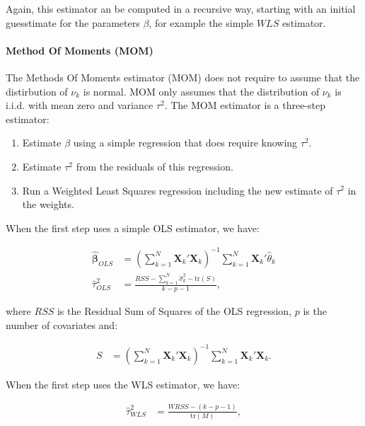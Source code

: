 \documentclass[
]{book}
\providecommand{\tightlist}{%
  \setlength{\itemsep}{0pt}\setlength{\parskip}{0pt}}
\theoremstyle{definition}
\theoremstyle{definition}
\theoremstyle{definition}
\theoremstyle{definition}
\theoremstyle{remark}
\begin{document}
Again, this estimator an be computed in a recursive way, starting with an initial guesstimate for the parameters \(\beta\), for example the simple \(WLS\) estimator.

\hypertarget{method-of-moments-mom}{%
\paragraph{Method Of Moments (MOM)}\label{method-of-moments-mom}}

The Methods Of Moments estimator (MOM) does not require to assume that the distirbution of \(\nu_k\) is normal.
MOM only assumes that the distribution of \(\nu_k\) is i.i.d. with mean zero and variance \(\tau^2\).
The MOM estimator is a three-step estimator:

\begin{enumerate}
\def\labelenumi{\arabic{enumi}.}
\tightlist
\item
  Estimate \(\beta\) using a simple regression that does require knowing \(\tau^2\).
\item
  Estimate \(\tau^2\) from the residuals of this regression.
\item
  Run a Weighted Least Squares regression including the new estimate of \(\tau^2\) in the weights.
\end{enumerate}

When the first step uses a simple OLS estimator, we have:

\begin{align*}
  \mathbf{\hat{\beta}}_{OLS} & = \left(\sum_{k=1}^N\mathbf{X}_k'\mathbf{X}_k\right)^{-1}\sum_{k=1}^N\mathbf{X}_k'\hat{\theta}_k \\
  \hat{\tau}^2_{OLS} & = \frac{RSS-\sum_{k=1}^N\hat{\sigma}^2_k-\text{tr}(S)}{k-p-1}, 
\end{align*}

where \(RSS\) is the Residual Sum of Squares of the OLS regression, \(p\) is the number of covariates and:

\begin{align*}
S & = \left(\sum_{k=1}^N\mathbf{X}_k'\mathbf{X}_k\right)^{-1}\sum_{k=1}^N\mathbf{X}_k'\mathbf{X}_k.
\end{align*}

When the first step uses the WLS estimator, we have:

\begin{align*}
  \hat{\tau}^2_{WLS} & = \frac{WRSS-(k-p-1)}{\text{tr}(M)}, 
\end{align*}
\end{document}
